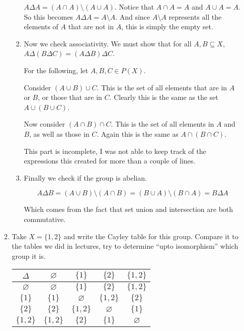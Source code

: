 \documentclass{article}
\begin{document}
\begin{enumerate}
\begin{enumerate}[label= (\alph*)]
\begin{enumerate}[label= (\roman*)]
            $A\Delta A=(A\cap A)\setminus(A\cup A)$. Notice that $A\cap A=A$ and $A\cup A=A$.
            So this becomes $A\Delta A= A\setminus A$. And since $A\setminus A$ represents all the
            elements of $A$ that are not in $A$, this is simply the empty set.

        \item Now we check associativity. We must show that for all $A,B\subseteq X$, 
            $A\Delta (B\Delta C)=(A\Delta B)\Delta C$.

            For the following, let $A,B,C\in  P(X)$.

            Consider $(A\cup B)\cup C$. This is the set of all elements that are in $A$ or $B$,
            or those that are in $C$. Clearly this is the same as the set $A\cup (B\cup C)$.

            Now consider $(A\cap B)\cap C$. This is the set of all elements in $A$ and $B$,
            as well as those in $C$. Again this is the same as $A\cap (B\cap C)$.

            This part is incomplete, I was not able to keep track of the expressions this created
            for more than a couple of lines.

        \item Finally we check if the group is abelian.

            $$A\Delta B=(A\cup B)\setminus(A\cap B)=(B\cup A)\setminus(B\cap A)=B\Delta A$$

            Which comes from the fact that set union and intersection are both commutative.
        \end{enumerate}

    \item Take $X = \{1, 2\}$ and write the Cayley table for this group. Compare it to the tables
    we did in lectures, try to determine “upto isomorphism” which group it is.

    \begin{tabular}{c|c c c c}
        $\Delta$ & $\varnothing$ & $\{1\}$ & $\{2\}$ & $\{1,2\}$ \\
        \hline
        $\varnothing$ & $\varnothing$ & $\{1\}$ & $\{2\}$ & $\{1,2\}$ \\
        $\{1\} $&$\{1\} $&$\varnothing$&$\{1,2\} $&$\{2\} $\\
        $\{2\} $ &$\{2\} $&$\{1,2\}$&$\varnothing$&$\{1\} $\\
        $\{1,2\}$&$\{1,2\}$&$\{2\} $&$\{1\}$&$\varnothing$ 
    \end{tabular}


\end{enumerate}
\end{enumerate}
\end{document}
